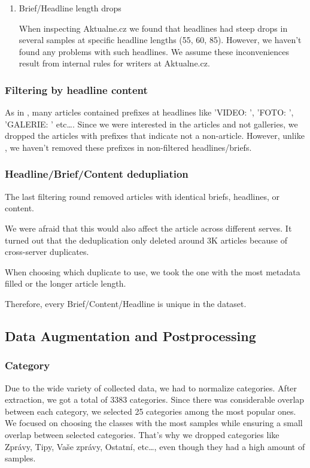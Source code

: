 \begin{itemize}
\begin{enumerate}
    \item Brief/Headline length drops

        When inspecting Aktualne.cz we found that headlines
        had steep drops in several samples at specific headline lengths (55, 60, 85).
        However, we haven't found any problems with such headlines.
        We assume these inconveniences result from internal rules for writers at Aktualne.cz.
\end{enumerate}

\subsubsection{Filtering by headline content}
As in \cite{strakaSumeCzechLargeCzech2018a}, many articles
contained prefixes at headlines like 'VIDEO: ', 'FOTO: ', 'GALERIE: ' etc\dots.
Since we were interested in the articles and not galleries,
we dropped the articles with prefixes that indicate not a non-article.
However, unlike \cite{strakaSumeCzechLargeCzech2018a}, we haven't removed these prefixes
in non-filtered headlines/briefs.




\subsubsection{Headline/Brief/Content dedupliation}
The last filtering round removed articles with identical briefs, headlines, or content.

We were afraid that this would also affect the article across different serves.
It turned out that the deduplication only deleted around 3K articles
because of cross-server duplicates.

When choosing which duplicate to use, we took the one with the most metadata filled
or the longer article length.

Therefore, every Brief/Content/Headline is unique in the dataset.

\subsection{Data Augmentation and Postprocessing}

\subsubsection{Category}
\label{sec:category}
Due to the wide variety of collected data, we had to normalize categories.
After extraction, we got a total of 3383 categories.
Since there was considerable overlap between each category,
we selected 25 categories among the most popular ones.
We focused on choosing the classes with the most samples
while ensuring a small overlap between selected categories.
That's why we dropped categories like Zprávy, Tipy, Vaše zprávy, Ostatní, etc\dots,
even though they had a high amount of samples.



\end{itemize}
